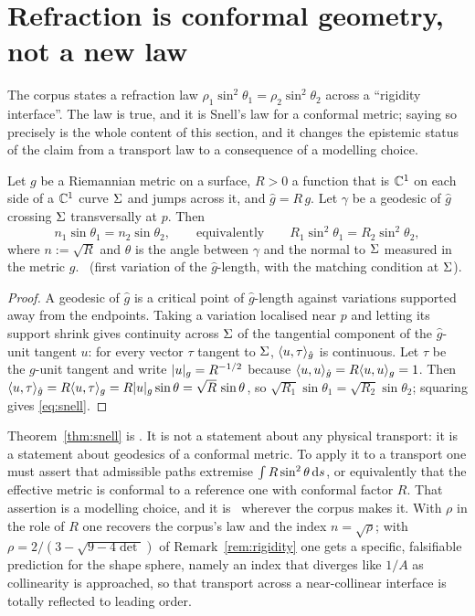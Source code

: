 \section{Refraction is conformal geometry, not a new law}\label{sec:refraction}

The corpus states a refraction law $\rho_1\sin^2\theta_1=\rho_2\sin^2\theta_2$ across a
``rigidity interface''. The law is true, and it is Snell's law for a conformal metric; saying so
precisely is the whole content of this section, and it changes the epistemic status of the claim
from a transport law to a consequence of a modelling choice.

\begin{theorem}\label{thm:snell}
Let $g$ be a Riemannian metric on a surface, $R>0$ a function that is $\mathbb{C}^1$ on each side of a
$\mathbb{C}^1$ curve $\Sigma$ and jumps across it, and $\hat g=R\,g$. Let $\gamma$ be a geodesic of
$\hat g$ crossing $\Sigma$ transversally at $p$. Then
\begin{equation}\label{eq:snell}
   n_1\sin\theta_1=n_2\sin\theta_2,\qquad\text{equivalently}\qquad
   R_1\sin^2\theta_1=R_2\sin^2\theta_2,
\end{equation}
where $n:=\sqrt R$ and $\theta$ is the angle between $\gamma$ and the normal to $\Sigma$
measured in the metric $g$.
\T\ (first variation of the $\hat g$-length, with the matching condition at $\Sigma$).
\end{theorem}

\begin{proof}
A geodesic of $\hat g$ is a critical point of $\hat g$-length against variations supported away
from the endpoints. Taking a variation localised near $p$ and letting its support shrink gives
continuity across $\Sigma$ of the tangential component of the $\hat g$-unit tangent $u$: for every
vector $\tau$ tangent to $\Sigma$, $\langle u,\tau\rangle_{\hat g}$ is continuous. Let $\tau$ be the
$g$-unit tangent and write $\lvert u\rvert_g=R^{-1/2}$ because $\langle u,u\rangle_{\hat g}=R\langle u,u\rangle_g=1$.
Then $\langle u,\tau\rangle_{\hat g}=R\langle u,\tau\rangle_g=R\lvert u\rvert_g\sin\theta=\sqrt R\,\sin\theta$, so
$\sqrt{R_1}\sin\theta_1=\sqrt{R_2}\sin\theta_2$; squaring gives \eqref{eq:snell}.
\end{proof}

\begin{remark}\label{rem:snell-grade}
Theorem~\ref{thm:snell} is \T. It is not a statement about any physical transport: it is a
statement about geodesics of a conformal metric. To apply it to a transport one must assert that
admissible paths extremise $\int R\sin^2\theta\,\mathrm{d} s$, or equivalently that the effective metric
is conformal to a reference one with conformal factor $R$. That assertion is a modelling choice,
and it is \Hh\ wherever the corpus makes it. With $\rho$ in the role of $R$ one recovers the
corpus's law and the index $n=\sqrt\rho$; with $\rho=2/(3-\sqrt{9-4\det})$ of
Remark~\ref{rem:rigidity} one gets a specific, falsifiable prediction for the shape sphere,
namely an index that diverges like $1/A$ as collinearity is approached, so that transport across
a near-collinear interface is totally reflected to leading order.
\end{remark}


